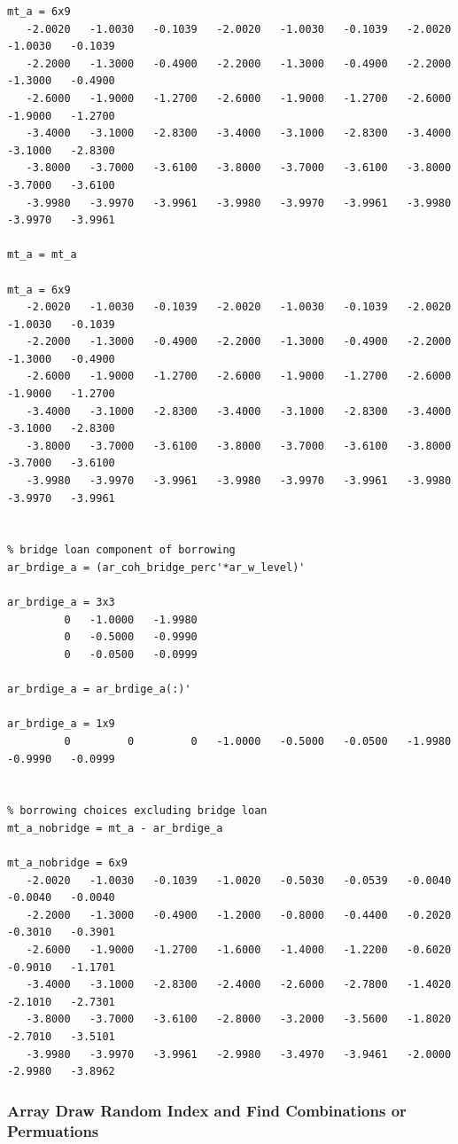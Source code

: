 \documentclass[
]{book}
\begin{document}
\begin{verbatim}
mt_a = 6x9    
   -2.0020   -1.0030   -0.1039   -2.0020   -1.0030   -0.1039   -2.0020   -1.0030   -0.1039
   -2.2000   -1.3000   -0.4900   -2.2000   -1.3000   -0.4900   -2.2000   -1.3000   -0.4900
   -2.6000   -1.9000   -1.2700   -2.6000   -1.9000   -1.2700   -2.6000   -1.9000   -1.2700
   -3.4000   -3.1000   -2.8300   -3.4000   -3.1000   -2.8300   -3.4000   -3.1000   -2.8300
   -3.8000   -3.7000   -3.6100   -3.8000   -3.7000   -3.6100   -3.8000   -3.7000   -3.6100
   -3.9980   -3.9970   -3.9961   -3.9980   -3.9970   -3.9961   -3.9980   -3.9970   -3.9961

mt_a = mt_a

mt_a = 6x9    
   -2.0020   -1.0030   -0.1039   -2.0020   -1.0030   -0.1039   -2.0020   -1.0030   -0.1039
   -2.2000   -1.3000   -0.4900   -2.2000   -1.3000   -0.4900   -2.2000   -1.3000   -0.4900
   -2.6000   -1.9000   -1.2700   -2.6000   -1.9000   -1.2700   -2.6000   -1.9000   -1.2700
   -3.4000   -3.1000   -2.8300   -3.4000   -3.1000   -2.8300   -3.4000   -3.1000   -2.8300
   -3.8000   -3.7000   -3.6100   -3.8000   -3.7000   -3.6100   -3.8000   -3.7000   -3.6100
   -3.9980   -3.9970   -3.9961   -3.9980   -3.9970   -3.9961   -3.9980   -3.9970   -3.9961


% bridge loan component of borrowing
ar_brdige_a = (ar_coh_bridge_perc'*ar_w_level)'

ar_brdige_a = 3x3    
         0   -1.0000   -1.9980
         0   -0.5000   -0.9990
         0   -0.0500   -0.0999

ar_brdige_a = ar_brdige_a(:)'

ar_brdige_a = 1x9    
         0         0         0   -1.0000   -0.5000   -0.0500   -1.9980   -0.9990   -0.0999


% borrowing choices excluding bridge loan
mt_a_nobridge = mt_a - ar_brdige_a

mt_a_nobridge = 6x9    
   -2.0020   -1.0030   -0.1039   -1.0020   -0.5030   -0.0539   -0.0040   -0.0040   -0.0040
   -2.2000   -1.3000   -0.4900   -1.2000   -0.8000   -0.4400   -0.2020   -0.3010   -0.3901
   -2.6000   -1.9000   -1.2700   -1.6000   -1.4000   -1.2200   -0.6020   -0.9010   -1.1701
   -3.4000   -3.1000   -2.8300   -2.4000   -2.6000   -2.7800   -1.4020   -2.1010   -2.7301
   -3.8000   -3.7000   -3.6100   -2.8000   -3.2000   -3.5600   -1.8020   -2.7010   -3.5101
   -3.9980   -3.9970   -3.9961   -2.9980   -3.4970   -3.9461   -2.0000   -2.9980   -3.8962
\end{verbatim}

\hypertarget{array-draw-random-index-and-find-combinations-or-permuations}{%
\subsubsection{Array Draw Random Index and Find Combinations or Permuations}\label{array-draw-random-index-and-find-combinations-or-permuations}}
\end{document}

